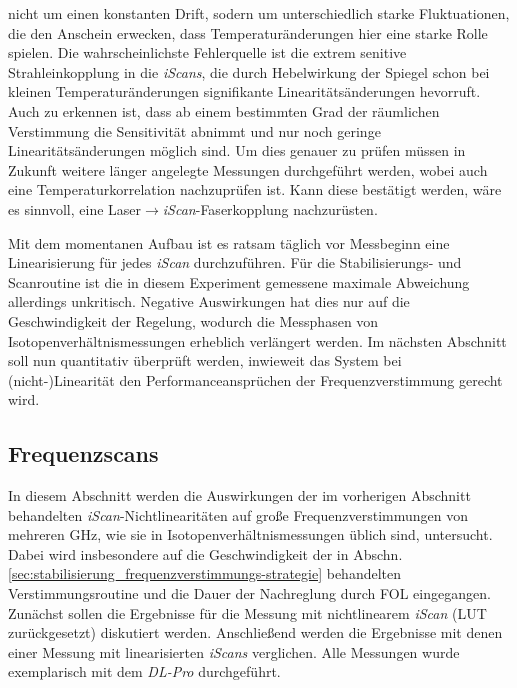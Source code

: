 nicht um einen konstanten Drift, sodern um unterschiedlich starke Fluktuationen,
die den Anschein erwecken, dass Temperaturänderungen hier eine starke Rolle
spielen. Die wahrscheinlichste Fehlerquelle ist die extrem senitive
Strahleinkopplung in die \textit{iScans}, die durch Hebelwirkung der Spiegel
schon bei kleinen Temperaturänderungen signifikante Linearitätsänderungen hevorruft. Auch zu
erkennen ist, dass ab einem bestimmten Grad der räumlichen Verstimmung die
Sensitivität abnimmt und nur noch geringe Linearitätsänderungen möglich sind. Um
dies genauer zu prüfen müssen in Zukunft weitere länger angelegte Messungen
durchgeführt werden, wobei auch eine Temperaturkorrelation nachzuprüfen ist.
Kann diese bestätigt werden, wäre es sinnvoll, eine Laser$\rightarrow$\textit{iScan}-Faserkopplung nachzurüsten.\par
Mit dem momentanen Aufbau ist es ratsam täglich vor Messbeginn eine
Linearisierung für jedes \textit{iScan} durchzuführen. Für die Stabilisierungs-
und Scanroutine ist die in diesem Experiment gemessene maximale Abweichung
allerdings unkritisch. Negative Auswirkungen hat dies nur auf die Geschwindigkeit der
Regelung, wodurch die Messphasen von Isotopenverhältnismessungen erheblich
verlängert werden. Im nächsten Abschnitt soll nun quantitativ überprüft werden,
inwieweit das System bei (nicht-)Linearität den Performanceansprüchen der
Frequenzverstimmung gerecht wird.

\subsection{Frequenzscans}\label{sec:frequenz_scans}
In diesem Abschnitt werden die Auswirkungen der im vorherigen Abschnitt
behandelten \textit{iScan}-Nichtlinearitäten auf große Frequenzverstimmungen
von mehreren GHz, wie sie in Isotopenverhältnismessungen üblich sind,
untersucht. Dabei wird insbesondere auf die Geschwindigkeit der in Abschn.
\ref{sec:stabilisierung_frequenzverstimmungs-strategie}
behandelten Verstimmungsroutine und die Dauer der Nachreglung durch FOL
eingegangen. Zunächst sollen die Ergebnisse für die Messung mit nichtlinearem
\textit{iScan} (LUT zurückgesetzt) diskutiert werden. Anschließend werden die
Ergebnisse mit denen einer Messung mit linearisierten \textit{iScans}
verglichen. Alle Messungen wurde exemplarisch mit dem \textit{DL-Pro} durchgeführt.

